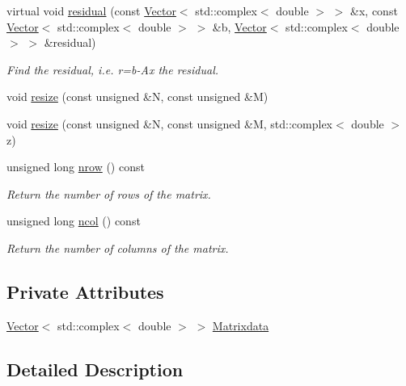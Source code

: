 \begin{DoxyCompactItemize}
virtual void \hyperlink{classoomph_1_1DiagonalComplexMatrix_a320b1114e1be99d82694793b30ce9251}{residual} (const \hyperlink{classoomph_1_1Vector}{Vector}$<$ std\+::complex$<$ double $>$ $>$ \&x, const \hyperlink{classoomph_1_1Vector}{Vector}$<$ std\+::complex$<$ double $>$ $>$ \&b, \hyperlink{classoomph_1_1Vector}{Vector}$<$ std\+::complex$<$ double $>$ $>$ \&residual)
\begin{DoxyCompactList}\small\item\em Find the residual, i.\+e. r=b-\/\+Ax the residual. \end{DoxyCompactList}\item 
void \hyperlink{classoomph_1_1DiagonalComplexMatrix_a35121313d09b76ef286893a7ce006b2e}{resize} (const unsigned \&N, const unsigned \&M)
\item 
void \hyperlink{classoomph_1_1DiagonalComplexMatrix_a587ae9dc56b4e338f027dd29c241b197}{resize} (const unsigned \&N, const unsigned \&M, std\+::complex$<$ double $>$ z)
\item 
unsigned long \hyperlink{classoomph_1_1DiagonalComplexMatrix_a9a58381c1aa8d680373305a27bc88c25}{nrow} () const
\begin{DoxyCompactList}\small\item\em Return the number of rows of the matrix. \end{DoxyCompactList}\item 
unsigned long \hyperlink{classoomph_1_1DiagonalComplexMatrix_ab56dee3ac2b928655382ad6697edd318}{ncol} () const
\begin{DoxyCompactList}\small\item\em Return the number of columns of the matrix. \end{DoxyCompactList}\end{DoxyCompactItemize}
\subsection*{Private Attributes}
\begin{DoxyCompactItemize}
\item 
\hyperlink{classoomph_1_1Vector}{Vector}$<$ std\+::complex$<$ double $>$ $>$ \hyperlink{classoomph_1_1DiagonalComplexMatrix_aee732a6697a2217457763c5c14a6fb26}{Matrixdata}
\end{DoxyCompactItemize}


\subsection{Detailed Description}


